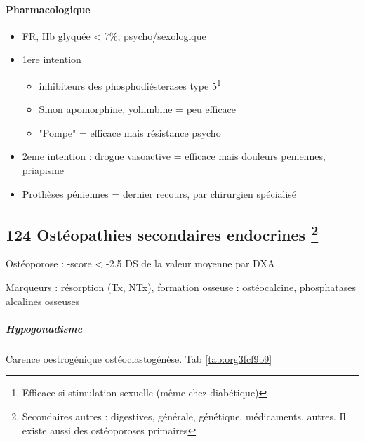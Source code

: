 \documentclass[11pt]{article}
\begin{document}
\paragraph{Pharmacologique}
\label{sec:org999ccc7}
\begin{itemize}
\item FR, Hb glyquée < 7\%, psycho/sexologique
\item 1ere intention 
\begin{itemize}
\item inhibiteurs des phosphodiésterases type 5\footnote{Efficace si stimulation sexuelle (même chez diabétique)}
\item Sinon apomorphine, yohimbine = peu efficace
\item "Pompe" = efficace mais résistance psycho
\end{itemize}
\item 2eme intention : drogue vasoactive = efficace mais douleurs peniennes, priapisme
\item Prothèses péniennes = dernier recours, par chirurgien spécialisé
\end{itemize}

\subsection{124 Ostéopathies secondaires endocrines \footnote{Secondaires autres : digestives, générale, génétique, médicaments,
autres. Il existe aussi des ostéoporoses primaires}}
\label{sec:org146c240}
Ostéoporose : -score < -2.5 DS de la valeur moyenne par DXA

Marqueurs : résorption (Tx, NTx), formation osseuse : ostéocalcine, phosphatases alcalines osseuses

\subparagraph{Hypogonadisme}
\label{sec:org9e4cd73}
Carence oestrogénique \inc ostéoclastogénèse. Tab \ref{tab:org3fcf9b9}
\end{document}
